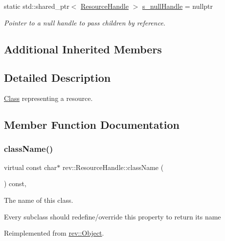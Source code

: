 \begin{DoxyCompactItemize}
\mbox{\label{classrev_1_1_resource_handle_a21e2db6afbc8da503c69bf0d644ac0dc}} 
static std\+::shared\+\_\+ptr$<$ \mbox{\hyperlink{classrev_1_1_resource_handle}{Resource\+Handle}} $>$ \mbox{\hyperlink{classrev_1_1_resource_handle_a21e2db6afbc8da503c69bf0d644ac0dc}{s\+\_\+null\+Handle}} = nullptr
\begin{DoxyCompactList}\small\item\em Pointer to a null handle to pass children by reference. \end{DoxyCompactList}\end{DoxyCompactItemize}
\subsection*{Additional Inherited Members}


\subsection{Detailed Description}
\mbox{\hyperlink{struct_class}{Class}} representing a resource. 

\subsection{Member Function Documentation}
\mbox{\label{classrev_1_1_resource_handle_a757714ddb5816e77198aceab2f4f0e1e}} 
\subsubsection{\texorpdfstring{className()}{className()}}
{\footnotesize\ttfamily virtual const char$\ast$ rev\+::\+Resource\+Handle\+::class\+Name (\begin{DoxyParamCaption}{ }\end{DoxyParamCaption}) const\hspace{0.3cm}{\ttfamily [inline]}, {\ttfamily [virtual]}}



The name of this class. 

Every subclass should redefine/override this property to return its name 

Reimplemented from \mbox{\hyperlink{classrev_1_1_object_a7a2013f91169479b65cf93afdc5d9a68}{rev\+::\+Object}}.


